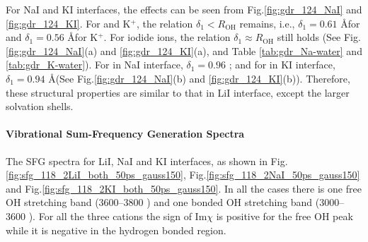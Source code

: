 For NaI and KI interfaces, the effects can be seen from Fig.\space\ref{fig:gdr_124_NaI} and \ref{fig:gdr_124_KI}. For \Na and K$^+$, 
the relation $\delta_1 < R_{\text{OH}}$ remains,
i.e., $\delta_1 = 0.61$ \AA for \Na and $\delta_1 = 0.56$ \AA  for K$^+$.
For iodide ions, the relation $\delta_1 \approx R_{\text{OH}}$ still holds (See Fig.\space\ref{fig:gdr_124_NaI}(a) and \ref{fig:gdr_124_KI}(a),
and Table \ref{tab:gdr_Na-water} and \ref{tab:gdr_K-water}). For \I in NaI interface, $\delta_1 = 0.96$ \A; 
and for \I in KI interface, $\delta_1 = 0.94$ \AA (See Fig.\space\ref{fig:gdr_124_NaI}(b) and \ref{fig:gdr_124_KI}(b)).
Therefore, these structural properties are similar to that in LiI interface, except the larger solvation shells.

\paragraph{Vibrational Sum-Frequency Generation Spectra}
The SFG spectra for LiI, NaI and KI interfaces, as shown in Fig.\space\ref{fig:sfg_118_2LiI_both_50ps_gauss150}, Fig.\space\ref{fig:sfg_118_2NaI_50ps_gauss150} and 
Fig.\space\ref{fig:sfg_118_2KI_both_50ps_gauss150}. In all the cases there is one free OH stretching band (3600--3800 \centimeter) and 
one bonded OH stretching band (3000--3600 \centimeter).
For all the three cations the sign of Im$\chi$ is positive for the free OH peak while it is negative in the hydrogen bonded region. %
